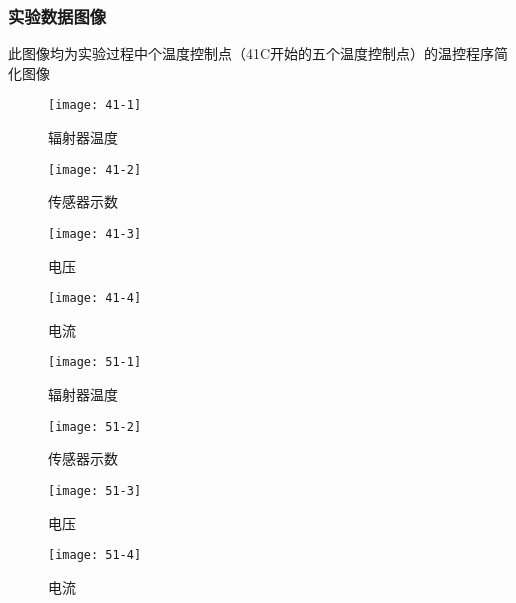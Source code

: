 \documentclass[dvipsnames, svgnames,a4paper,11pt]{article}
\begin{document}
  \subsubsection{实验数据图像}
  此图像均为实验过程中个温度控制点（41\textdegree C开始的五个温度控制点）的温控程序简化图像
  \begin{figure}[H]
    \centering
    \begin{minipage}[b]{0.23\linewidth}
        \centering
        \texttt{[image: 41-1]}
        \caption{辐射器温度}
    \end{minipage}
    \hfill
    \begin{minipage}[b]{0.23\linewidth}
        \centering
        \texttt{[image: 41-2]}
        \caption{传感器示数}
    \end{minipage}
    \hfill
    \begin{minipage}[b]{0.23\linewidth}
        \centering
        \texttt{[image: 41-3]}
        \caption{电压}
    \end{minipage}
    \hfill
    \begin{minipage}[b]{0.23\linewidth}
        \centering
        \texttt{[image: 41-4]}
        \caption{电流}
    \end{minipage}
\end{figure}
\begin{figure}[H]
    \centering
    \begin{minipage}[b]{0.23\linewidth}
        \centering
        \texttt{[image: 51-1]}
        \caption{辐射器温度}
    \end{minipage}
    \hfill
    \begin{minipage}[b]{0.23\linewidth}
        \centering
        \texttt{[image: 51-2]}
        \caption{传感器示数}
    \end{minipage}
    \hfill
    \begin{minipage}[b]{0.23\linewidth}
        \centering
        \texttt{[image: 51-3]}
        \caption{电压}
    \end{minipage}
    \hfill
    \begin{minipage}[b]{0.23\linewidth}
        \centering
        \texttt{[image: 51-4]}
        \caption{电流}
    \end{minipage}
\end{figure}
\end{document}
